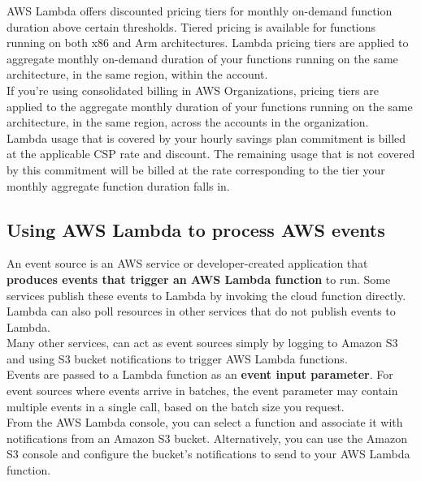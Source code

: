 \documentclass[12pt, letterpaper, twoside]{article}
\begin{document}
AWS Lambda offers discounted pricing tiers for monthly on-demand function duration above certain thresholds. Tiered pricing is 
available for functions running on both x86 and Arm architectures. Lambda pricing tiers are applied to aggregate monthly on-demand 
duration of your functions running on the same architecture, in the same region, within the account.\\
If you’re using consolidated billing in AWS Organizations, pricing tiers are applied to the aggregate monthly duration of your 
functions running on the same architecture, in the same region, across the accounts in the organization.\\

Lambda usage that is covered by your hourly savings plan commitment is billed at the applicable CSP rate and discount. 
The remaining usage that is not covered by this commitment will be billed at the rate corresponding to the tier your monthly 
aggregate function duration falls in.\\

\subsection{Using AWS Lambda to process AWS events}
An event source is an AWS service or developer-created application that \textbf{produces events that trigger an AWS Lambda function} to 
run. Some services publish these events to Lambda by invoking the cloud function directly.\\
Lambda can also poll resources in other services that do not publish events to Lambda.\\
Many other services, can act as event sources simply by logging to Amazon S3 and using S3 bucket notifications to trigger AWS 
Lambda functions.\\

Events are passed to a Lambda function as an \textbf{event input parameter}. For event sources where events arrive in batches, the event 
parameter may contain multiple events in a single call, based on the batch size you request.\\

From the AWS Lambda console, you can select a function and associate it with notifications from an Amazon S3 bucket. 
Alternatively, you can use the Amazon S3 console and configure the bucket’s notifications to send to your AWS Lambda function.\\
\end{document}
